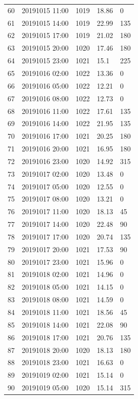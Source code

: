 \documentclass{article}\usepackage[]{graphicx}\usepackage[]{color}
\begin{document}
\begin{tabular}{rllll}
  60 & 20191015 11:00 & 1019 & 18.86 & 0 \\ 
  61 & 20191015 14:00 & 1019 & 22.99 & 135 \\ 
  62 & 20191015 17:00 & 1019 & 21.02 & 180 \\ 
  63 & 20191015 20:00 & 1020 & 17.46 & 180 \\ 
  64 & 20191015 23:00 & 1021 & 15.1 & 225 \\ 
  65 & 20191016 02:00 & 1022 & 13.36 & 0 \\ 
  66 & 20191016 05:00 & 1022 & 12.21 & 0 \\ 
  67 & 20191016 08:00 & 1022 & 12.73 & 0 \\ 
  68 & 20191016 11:00 & 1022 & 17.61 & 135 \\ 
  69 & 20191016 14:00 & 1022 & 21.95 & 135 \\ 
  70 & 20191016 17:00 & 1021 & 20.25 & 180 \\ 
  71 & 20191016 20:00 & 1021 & 16.95 & 180 \\ 
  72 & 20191016 23:00 & 1020 & 14.92 & 315 \\ 
  73 & 20191017 02:00 & 1020 & 13.48 & 0 \\ 
  74 & 20191017 05:00 & 1020 & 12.55 & 0 \\ 
  75 & 20191017 08:00 & 1020 & 13.21 & 0 \\ 
  76 & 20191017 11:00 & 1020 & 18.13 & 45 \\ 
  77 & 20191017 14:00 & 1020 & 22.48 & 90 \\ 
  78 & 20191017 17:00 & 1020 & 20.74 & 135 \\ 
  79 & 20191017 20:00 & 1021 & 17.53 & 90 \\ 
  80 & 20191017 23:00 & 1021 & 15.96 & 0 \\ 
  81 & 20191018 02:00 & 1021 & 14.96 & 0 \\ 
  82 & 20191018 05:00 & 1021 & 14.15 & 0 \\ 
  83 & 20191018 08:00 & 1021 & 14.59 & 0 \\ 
  84 & 20191018 11:00 & 1021 & 18.56 & 45 \\ 
  85 & 20191018 14:00 & 1021 & 22.08 & 90 \\ 
  86 & 20191018 17:00 & 1021 & 20.76 & 135 \\ 
  87 & 20191018 20:00 & 1020 & 18.13 & 180 \\ 
  88 & 20191018 23:00 & 1021 & 16.63 & 0 \\ 
  89 & 20191019 02:00 & 1021 & 15.14 & 0 \\ 
  90 & 20191019 05:00 & 1020 & 15.14 & 315 \\ 

\end{tabular}
\end{document}
